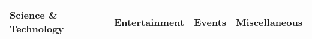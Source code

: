 \begin{table}[!t]
\begin{tabular}{|l|l|l|l|}
\hline
\textbf{Science} \& \textbf{Technology}                                                                                                                               & \textbf{Entertainment}                                                                                                                                                                              & \textbf{Events}                                                                                                                                                                         & \textbf{Miscellaneous}                                                                                                                                                                                                                                                 \\ \hline

\end{tabular}
\end{table}
